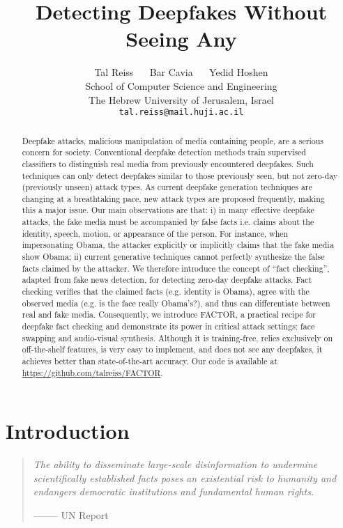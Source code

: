\documentclass{article} \usepackage{iclr2024_conference,times}
\title{Detecting Deepfakes Without Seeing Any}
\author{Tal Reiss  $\quad$  Bar Cavia $\quad$ Yedid Hoshen\\
School of Computer Science and Engineering\\
The Hebrew University of Jerusalem, Israel\\ 
{\tt\small tal.reiss@mail.huji.ac.il}\\
}
\begin{document}
\maketitle
\begin{abstract}    
Deepfake attacks, malicious manipulation of media containing people, are a serious concern for society. Conventional deepfake detection methods train supervised classifiers to distinguish real media from previously encountered deepfakes. Such techniques can only detect deepfakes similar to those previously seen, but not zero-day (previously unseen) attack types. As current deepfake generation techniques are changing at a breathtaking pace, new attack types are proposed frequently, making this a major issue. Our main observations are that: i) in many effective deepfake attacks, the fake media must be accompanied by false facts i.e. claims about the identity, speech, motion, or appearance of the person. For instance, when impersonating Obama, the attacker explicitly or implicitly claims that the fake media show Obama; ii) current generative techniques cannot perfectly synthesize the false facts claimed by the attacker. We therefore introduce the concept of “fact checking”, adapted from fake news detection, for detecting zero-day deepfake attacks. Fact checking verifies that the claimed facts (e.g. identity is Obama), agree with the observed media (e.g. is the face really Obama’s?), and thus can differentiate between real and fake media. Consequently, we introduce FACTOR, a practical recipe for deepfake fact checking and demonstrate its power in critical attack settings: face swapping and audio-visual synthesis. Although it is training-free, relies exclusively on off-the-shelf features, is very easy to implement, and does not see any deepfakes, it achieves better than state-of-the-art accuracy.  Our code is available at \url{https://github.com/talreiss/FACTOR}.
\end{abstract}

\section{Introduction}
\vspace{0.5em}
\begin{quote}
\textit{The ability to disseminate large-scale disinformation to undermine
scientifically established facts poses an existential risk to humanity and
endangers democratic institutions and fundamental human rights.}
\begin{flushright}
    \small{-------- UN Report}
  \end{flushright}
\end{quote}
\end{document}

